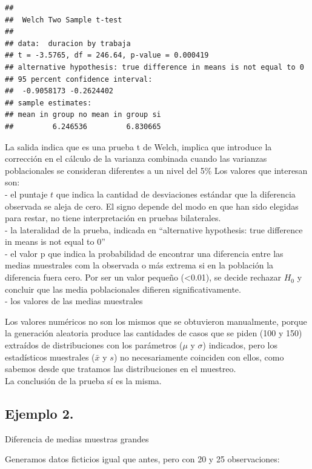 \documentclass[]{book}
\begin{document}
\begin{verbatim}
## 
##  Welch Two Sample t-test
## 
## data:  duracion by trabaja
## t = -3.5765, df = 246.64, p-value = 0.000419
## alternative hypothesis: true difference in means is not equal to 0
## 95 percent confidence interval:
##  -0.9058173 -0.2624402
## sample estimates:
## mean in group no mean in group si 
##         6.246536         6.830665
\end{verbatim}

La salida indica que es una prueba t de Welch, implica que introduce la corrección en el cálculo de la varianza combinada cuando las varianzas poblacionales se consideran diferentes a un nivel del 5\%
Los valores que interesan son:\\
- el puntaje \(t\) que indica la cantidad de desviaciones estándar que la diferencia observada se aleja de cero. El signo depende del modo en que han sido elegidas para restar, no tiene interpretación en pruebas bilaterales.\\
- la lateralidad de la prueba, indicada en ``alternative hypothesis: true difference in means is not equal to 0''\\
- el valor p que indica la probabilidad de encontrar una diferencia entre las medias muestrales com la observada o más extrema si en la población la diferencia fuera cero. Por ser un valor pequeño (\textless{}0.01), se decide rechazar \(H_{0}\) y concluir que las media poblacionales difieren significativamente.\\
- los valores de las medias muestrales

Los valores numéricos no son los mismos que se obtuvieron manualmente, porque la generación aleatoria produce las cantidades de casos que se piden (100 y 150) extraídos de distribuciones con los parámetros (\(\mu\) y \(\sigma\)) indicados, pero los estadísticos muestrales (\(\bar{x}\) y \(s\)) no necesariamente coinciden con ellos, como sabemos desde que tratamos las distribuciones en el muestreo.\\
La conclusión de la prueba sí es la misma.

\hypertarget{ejemplo-2.}{%
\subsection{Ejemplo 2.}\label{ejemplo-2.}}

Diferencia de medias muestras grandes

Generamos datos ficticios igual que antes, pero con 20 y 25 observaciones:
\end{document}
